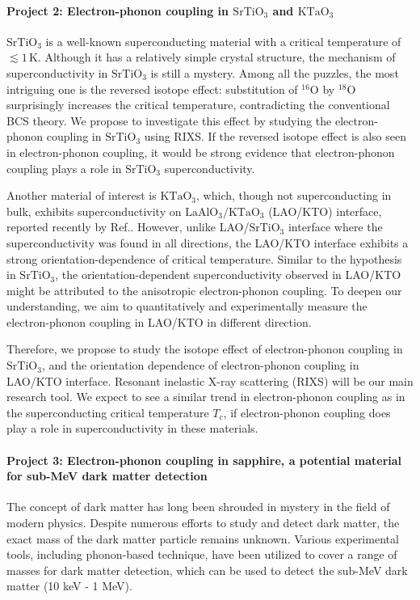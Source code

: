 \documentclass[11pt]{article}
\begin{document}
\paragraph{Project 2: Electron-phonon coupling in $\mathrm{SrTiO_{3}}$ and $\mathrm{KTaO_{3}}$} 
$\mathrm{SrTiO_{3}}$ is a well-known superconducting material with a critical temperature of $\lesssim 1\, \mathrm{K}$\cite{schooley_superconductivity_1964,lin_fermi_2013}. Although it has a relatively simple crystal structure, the mechanism of superconductivity in $\mathrm{SrTiO_{3}}$ is still a mystery. Among all the puzzles, the most intriguing one is the reversed isotope effect: substitution of ${}^{16}\mathrm{O}$ by ${}^{18}\mathrm{O}$ surprisingly increases the critical temperature, contradicting the conventional BCS theory\cite{stucky_isotope_2016}. We propose to investigate this effect by studying the electron-phonon coupling in $\mathrm{SrTiO_{3}}$ using RIXS. If the reversed isotope effect is also seen in electron-phonon coupling, it would be strong evidence that electron-phonon coupling plays a role in $\mathrm{SrTiO_{3}}$ superconductivity.

Another material of interest is $\mathrm{KTaO_{3}}$, which, though not superconducting in bulk, exhibits superconductivity on $\mathrm{LaAlO_{3}/KTaO_{3}}$ (LAO/KTO) interface, reported recently by Ref.\cite{ren_two-dimensional_2022}. However, unlike LAO/$\mathrm{SrTiO_{3}}$ interface where the superconductivity was found in all directions, the LAO/KTO interface exhibits a strong orientation-dependence of critical temperature\cite{ren_two-dimensional_2022,chen_two-dimensional_2021}. Similar to the hypothesis in $\mathrm{SrTiO_{3}}$, the orientation-dependent superconductivity observed in LAO/KTO might be attributed to the anisotropic electron-phonon coupling. To deepen our understanding, we aim to quantitatively and experimentally measure the electron-phonon coupling in LAO/KTO in different direction.


Therefore, we propose to study the isotope effect of electron-phonon coupling in $\mathrm{SrTiO_{3}}$, and the orientation dependence of electron-phonon coupling in LAO/KTO interface. Resonant inelastic X-ray scattering (RIXS) will be our main research tool. We expect to see a similar trend in electron-phonon coupling as in the superconducting critical temperature $T_{c}$, if electron-phonon coupling does play a role in superconductivity in these materials.



\paragraph{Project 3: Electron-phonon coupling in sapphire, a potential material for sub-MeV dark matter detection}
The concept of dark matter has long been shrouded in mystery in the field of modern physics. Despite numerous efforts to study and detect dark matter\cite{bergstrom_non-baryonic_2000,vogel_dark_2014,essig_first_2012,davidson_updated_2000}, the exact mass of the dark matter particle remains unknown. Various experimental tools, including phonon-based technique, have been utilized to cover a range of masses for dark matter detection, which can be used to detect the sub-MeV dark matter (10 keV - 1 MeV).
  
\end{document}
